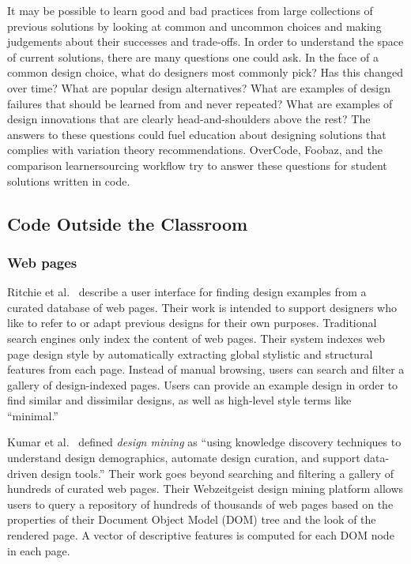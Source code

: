 It may be possible to learn good and bad practices from large collections of previous solutions by looking at common and uncommon choices and making judgements about their successes and trade-offs. In order to understand the space of current solutions, there are many questions one could ask. In the face of a common design choice, what do designers most commonly pick? Has this changed over time? What are popular design alternatives? What are examples of design failures that should be learned from and never repeated? What are examples of design innovations that are clearly head-and-shoulders above the rest? The answers to these questions could fuel education about designing solutions that complies with variation theory recommendations. OverCode, Foobaz, and the comparison learnersourcing workflow try to answer these questions for student solutions written in code.


\subsection{Code Outside the Classroom}

\subsubsection{Web pages}
Ritchie et al.~\cite{ritchie2011d} describe a user interface for finding design examples from a curated database of web pages. Their work is intended to support designers who like to refer to or adapt previous designs for their own purposes. Traditional search engines only index the content of web pages. Their system indexes web page design style by automatically extracting global stylistic and structural features from each page. Instead of manual browsing, users can search and filter a gallery of design-indexed pages. Users can provide an example design in order to find similar and dissimilar designs, as well as high-level style terms like ``minimal.''

Kumar et al.~\cite{webzeitgeist} defined {\it design mining} as ``using knowledge discovery techniques to understand design demographics, automate design curation, and support data-driven design tools.'' Their work goes beyond searching and filtering a gallery of hundreds of curated web pages. Their Webzeitgeist design mining platform allows users to query a repository of hundreds of thousands of web pages based on the properties of their Document Object Model (DOM) tree and the look of the rendered page. A vector of descriptive features is computed for each DOM node in each page.

